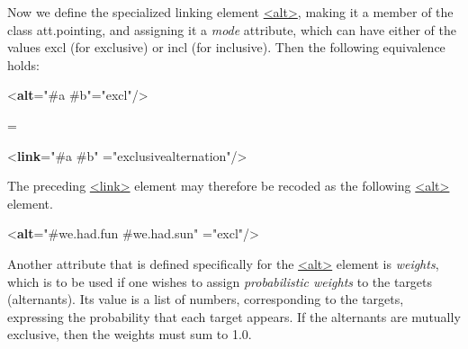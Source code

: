 Now we define the specialized linking element \hyperref[TEI.alt]{<alt>}, making it a member of the class \textsf{att.pointing}, and assigning it a {\itshape mode} attribute, which can have either of the values excl (for exclusive) or incl (for inclusive). Then the following equivalence holds: \par\bgroup{}\exampleFont \begin{shaded}\noindent\mbox{}{<\textbf{alt}\hspace*{1em}{target}="{\#a \#b}"\hspace*{1em}{mode}="{excl}"/>}\end{shaded}\egroup\par \noindent  = \par\bgroup{}\exampleFont \begin{shaded}\noindent\mbox{}{<\textbf{link}\hspace*{1em}{target}="{\#a \#b}"\mbox{}\newline 
\hspace*{1em}{type}="{exclusive\textunderscore alternation}"/>}\end{shaded}\egroup\par \par
The preceding \hyperref[TEI.link]{<link>} element may therefore be recoded as the following \hyperref[TEI.alt]{<alt>} element. \par\bgroup{}\exampleFont \begin{shaded}\noindent\mbox{}{<\textbf{alt}\hspace*{1em}{target}="{\#we.had.fun \#we.had.sun}"\mbox{}\newline 
\hspace*{1em}{mode}="{excl}"/>}\end{shaded}\egroup\par \par
Another attribute that is defined specifically for the \hyperref[TEI.alt]{<alt>} element is {\itshape weights}, which is to be used if one wishes to assign \textit{probabilistic weights} to the targets (alternants). Its value is a list of numbers, corresponding to the targets, expressing the probability that each target appears.  If the alternants are mutually exclusive, then the weights must sum to 1.0.\par
